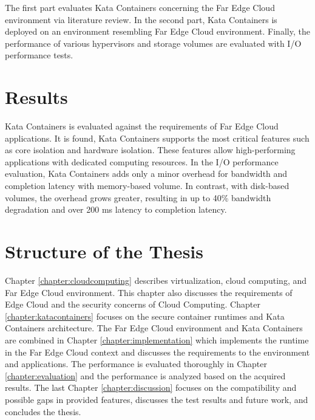 The first part evaluates Kata Containers concerning the Far Edge Cloud environment via literature review. In the second part, Kata Containers is deployed on an environment resembling Far Edge Cloud environment. Finally, the performance of various hypervisors and storage volumes are evaluated with I/O performance tests.

\section{Results}
\label{section:intro_results}

Kata Containers is evaluated against the requirements of Far Edge Cloud applications. It is found, Kata Containers supports the most critical features such as core isolation and hardware isolation. These features allow high-performing applications with dedicated computing resources. In the I/O performance evaluation, Kata Containers adds only a minor overhead for bandwidth and completion latency with memory-based volume. In contrast, with disk-based volumes, the overhead grows greater, resulting in up to 40\% bandwidth degradation and over 200 ms latency to completion latency.

\section{Structure of the Thesis}
\label{section:intro_structure}

Chapter \ref{chapter:cloudcomputing} describes virtualization, cloud computing, and Far Edge Cloud environment. This chapter also discusses the requirements of Edge Cloud and the security concerns of Cloud Computing. Chapter \ref{chapter:katacontainers} focuses on the secure container runtimes and Kata Containers architecture. The Far Edge Cloud environment and Kata Containers are combined in Chapter \ref{chapter:implementation} which implements the runtime in the Far Edge Cloud context and discusses the requirements to the environment and applications. The performance is evaluated thoroughly in Chapter \ref{chapter:evaluation} and the performance is analyzed based on the acquired results. The last Chapter \ref{chapter:discussion} focuses on the compatibility and possible gaps in provided features, discusses the test results and future work, and concludes the thesis.